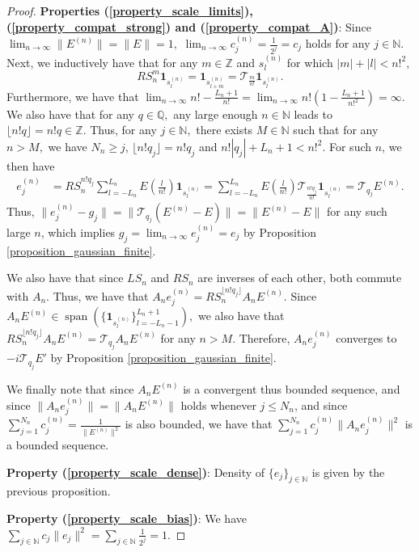 \documentclass[10pt,a4paper]{amsart}
\def \Span{\operatorname{span}}
\begin{document}
\begin{proof}
	\textbf{Properties (\ref{property_scale_limits}), (\ref{property_compat_strong}) and (\ref{property_compat_A})}: Since $\lim_{n\rightarrow\infty}\|E^{(n)}\|=\|E\|=1,$   $\lim_{n\rightarrow\infty} c_j^{(n)}=\frac{1}{2^j}=c_j$ holds for any $j\in\mathbb{N}.$ Next, we inductively have that for any $m\in\mathbb{Z}$ and $s_l^{(n)}$ for which $|m|+|l|<n!^2,$ $$RS_n^m\mathbf{1}_{s_l^{(n)}}=\mathbf{1}_{s_{l+m}^{(n)}}=\mathcal{T}_{\frac{m}{n!}}\mathbf{1}_{s_l^{(n)}}.$$ Furthermore, we have that $\lim_{n\rightarrow\infty}n!-\frac{L_n+1}{n!}=\lim_{n\rightarrow\infty}n!(1-\frac{L_n+1}{n!^2})=\infty$. We also have that for any $q\in\mathbb{Q},$ any large enough $n\in\mathbb{N}$ leads to $\lfloor n!q \rfloor=n!q\in\mathbb{Z}.$ Thus, for any $j\in\mathbb{N},$ there exists $M\in\mathbb{N}$ such that for any $n>M,$ we have  $N_n\geq j$, $\lfloor n!q_j\rfloor=n!q_j$ and $n!|q_j|+L_n+1<n!^2.$ For such $n$, we then have
	\begin{align*}
		e_j^{(n)}&=RS_n^{n!q_j}\sum_{l=-L_n}^{L_n}E\left(\frac{l}{n!}\right)\mathbf{1}_{s_l^{(n)}}=\sum_{l=-L_n}^{L_n}E\left(\frac{l}{n!}\right)\mathcal{T}_{\frac{n!q_j}{n!}}\mathbf{1}_{s_{l}^{(n)}}=\mathcal{T}_{q_j}E^{(n)}.
	\end{align*}
	 Thus, $\|e_j^{(n)}-g_j\|=\|\mathcal{T}_{q_j}(E^{(n)}-E)\|=\|E^{(n)}-E\|$ for any such large $n$, which implies $g_j=\lim_{n\rightarrow\infty} e_j^{(n)}=e_j$  by Proposition \ref{proposition_gaussian_finite}.
	 
	 We also have that since $LS_n$ and $RS_n$ are inverses of each other, both commute with $A_n$. Thus, we have that $A_ne_j^{(n)}=RS_n^{\lfloor n!q_j\rfloor}A_nE^{(n)}.$ Since $A_nE^{(n)}\in\Span(\{\mathbf{1}_{s_l^{(n)}}\}_{l=-L_n-1}^{L_n+1}),$ we also have that $RS_n^{\lfloor n!q_j\rfloor}A_nE^{(n)}=\mathcal{T}_{q_j}A_nE^{(n)}$ for any $n>M.$ Therefore, $A_n e_j^{(n)}$ converges to $-i\mathcal{T}_{q_j}E'$ by Proposition \ref{proposition_gaussian_finite}. 
	 
	 We finally note that since $A_nE^{(n)}$ is a convergent thus bounded sequence, and since $\|A_ne_j^{(n)}\|=\|A_nE^{(n)}\|$ holds whenever $j\leq N_n$, and since $\sum_{j=1}^{N_n}c_j^{(n)}=\frac{1}{\|E^{(n)}\|^2}$ is also bounded, we have that $\sum_{j=1}^{N_n}c_j^{(n)}\|A_ne_j^{(n)}\|^2$ is a bounded sequence.
	
	\textbf{Property (\ref{property_scale_dense})}: Density of $\{e_j\}_{j\in\mathbb{N}}$ is given by the previous proposition.
	
	\textbf{Property (\ref{property_scale_bias})}: We have $\sum_{j\in\mathbb{N}}c_j\|e_j\|^2=\sum_{j\in\mathbb{N}}\frac{1}{2^j}=1.$
	

\end{proof}
\end{document}
